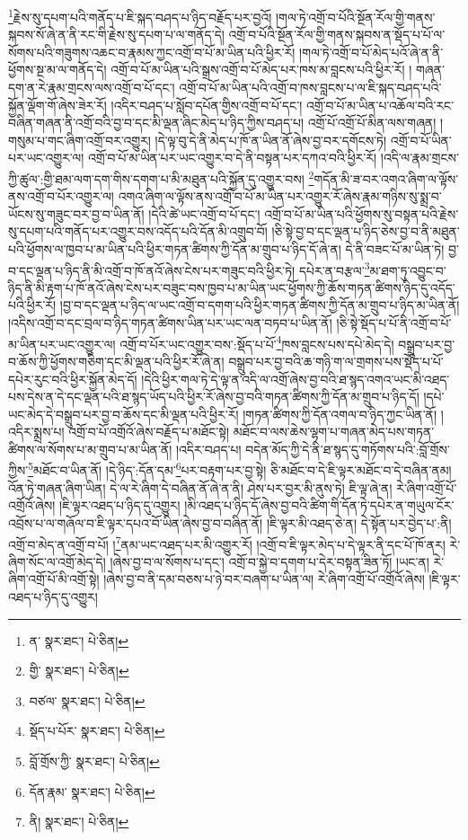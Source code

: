 \footnote{ན་  སྣར་ཐང་།  པེ་ཅིན། }རྗེས་སུ་དཔག་པའི་གནོད་པ་ཇི་སྐད་བཤད་པ་ཉིད་བརྗོད་པར་བྱའོ། །གལ་ཏེ་འགྲོ་བ་པོའི་སྔོན་རོལ་གྱི་གནས་སྐབས་སོ་ཞེ་ན་ནི་རང་གི་རྗེས་སུ་དཔག་པ་ལ་གནོད་དེ། འགྲོ་བ་པོའི་སྔོན་རོལ་གྱི་གནས་སྐབས་ན་སྡོད་པ་པོ་ལ་སོགས་པའི་གཟུགས་འཆང་བ་རྣམས་ཀྱང་འགྲོ་བ་པོ་མ་ཡིན་པའི་ཕྱིར་རོ། །གལ་ཏེ་འགྲོ་བ་པོ་མེད་པའོ་ཞེ་ན་ནི་ཕྱོགས་སྔ་མ་ལ་གནོད་དེ། འགྲོ་བ་པོ་མ་ཡིན་པའི་སྒྲས་འགྲོ་བ་པོ་མེད་པར་ཁས་མ་བླངས་པའི་ཕྱིར་རོ། །
གཞན་དག་ན་རེ་རྣམ་གྲངས་ལས་འགྲོ་བ་པོ་དང་། འགྲོ་བ་པོ་མ་ཡིན་པའི་འགྲོ་བ་ཁས་བླངས་པ་ལ་ཇི་སྐད་བཤད་པའི་སྐྱོན་ལྡོག་གོ་ཞེས་ཟེར་རོ། །འདིར་བཤད་པ་སློབ་དཔོན་གྱིས་འགྲོ་བ་པོ་དང་། འགྲོ་བ་པོ་མ་ཡིན་པ་འཆོལ་བའི་རང་བཞིན་གཞན་ནི་འགྲོ་བའི་བྱ་བ་དང་མི་ལྡན་ཞིང་མེད་པ་ཉིད་ཀྱིས་བཤད་པ། འགྲོ་པོ་འགྲོ་པོ་མིན་ལས་གཞན། །གསུམ་པ་གང་ཞིག་འགྲོ་བར་འགྱུར། །དེ་ལྟ་བུ་དེ་ནི་མེད་པ་ཁོ་ན་ཡིན་ནོ་ཞེས་བྱ་བར་དགོངས་ཏེ། འགྲོ་བ་པོ་ཡིན་པར་ཡང་འགྱུར་ལ། འགྲོ་བ་པོ་མ་ཡིན་པར་ཡང་འགྱུར་བ་དེ་ནི་བསྟན་པར་དཀའ་བའི་ཕྱིར་རོ། །འདི་ལ་རྣམ་གྲངས་ཀྱི་ཚུལ་:གྱི་ཐམ་ལག་དག་གིས་དགག་པ་མི་མཐུན་པའི་སྐྱོན་དུ་འགྱུར་བས། \footnote{གྱི་  སྣར་ཐང་།  པེ་ཅིན། }གདོན་མི་ཟ་བར་འགའ་ཞིག་ལ་ལྟོས་ནས་འགྲོ་བ་པོར་འགྱུར་ལ། འགའ་ཞིག་ལ་ལྟོས་ནས་འགྲོ་བ་པོ་མ་ཡིན་པར་འགྱུར་རོ་ཞེས་རྣམ་གཉིས་སུ་སྨྲ་བ་ཡོངས་སུ་གཟུང་བར་བྱ་བ་ཡིན་ནོ། །དེའི་ཚེ་ཡང་འགྲོ་བ་པོ་དང་། འགྲོ་བ་པོ་མ་ཡིན་པའི་ཕྱོགས་སུ་བསྟན་པའི་རྗེས་སུ་དཔག་པའི་གནོད་པར་འགྱུར་བས་འདོད་པའི་དོན་མི་འགྲུབ་བོ། །ཅི་སྟེ་བྱ་བ་དང་ལྡན་པ་ཉིད་ཅེས་བྱ་བ་ནི་མཐུན་པའི་ཕྱོགས་ལ་ཁྱབ་པ་མ་ཡིན་པའི་ཕྱིར་གཏན་ཚིགས་ཀྱི་དོན་མ་གྲུབ་པ་ཉིད་དོ་ཞེ་ན། དེ་ནི་བཟང་པོ་མ་ཡིན་ཏེ། བྱ་བ་དང་ལྡན་པ་ཉིད་ནི་མི་འགྲོ་བ་ཁོ་ནའོ་ཞེས་ངེས་པར་གཟུང་བའི་ཕྱིར་ཏེ། དཔེར་ན་བརྩལ་\footnote{བཙལ་  སྣར་ཐང་།  པེ་ཅིན། }མ་ཐག་ཏུ་འབྱུང་བ་ཉིད་ནི་མི་རྟག་པ་ཁོ་ནའོ་ཞེས་ངེས་པར་བཟུང་བས་ཁྱབ་པ་མ་ཡིན་ཡང་ཕྱོགས་ཀྱི་ཆོས་གཏན་ཚིགས་ཉིད་དུ་འདོད་པའི་ཕྱིར་རོ། །བྱ་བ་དང་ལྡན་པ་ཉིད་ལ་ཡང་འགྲོ་བ་དགག་པའི་ཕྱིར་གཏན་ཚིགས་ཀྱི་དོན་མ་གྲུབ་པ་ཉིད་མ་ཡིན་ནོ། །འདིས་འགྲོ་བ་དང་བྲལ་བ་ཉིད་གཏན་ཚིགས་ཡིན་པར་ཡང་ལན་བཏབ་པ་ཡིན་ནོ། །ཅི་སྟེ་སྡོད་པ་པོ་ནི་འགྲོ་བ་པོ་མ་ཡིན་པར་ཡང་འགྱུར་ལ། འགྲོ་བ་པོར་ཡང་འགྱུར་བས་:སྡོད་པ་པོ་\footnote{སྡོད་པ་པོར་  སྣར་ཐང་།  པེ་ཅིན། }ཁས་བླངས་པས་དཔེ་མེད་དེ། བསྒྲུབ་པར་བྱ་བ་ཆོས་ཀྱི་ཕྱོགས་གཅིག་དང་མི་ལྡན་པའི་ཕྱིར་རོ་ཞེ་ན། བསྒྲུབ་པར་བྱ་བའི་ཆ་གཉི་ག་ལ་གྲགས་པས་སྡོད་པ་པོ་དཔེར་རུང་བའི་ཕྱིར་སྐྱོན་མེད་དོ། །དེའི་ཕྱིར་གལ་ཏེ་དེ་ལྟ་ན་འདི་ལ་འགྲོ་ཞེས་བྱ་བའི་ཐ་སྙད་འགའ་ཡང་མི་འཐད་པས་དེས་ན་དེ་དང་ལྡན་པའི་ཐ་སྙད་ཡོད་པའི་ཕྱིར་རོ་ཞེས་བྱ་བའི་གཏན་ཚིགས་ཀྱི་དོན་མ་གྲུབ་པ་ཉིད་དོ། །དཔེ་ཡང་མེད་དེ་བསྒྲུབ་པར་བྱ་བ་ཆོས་དང་མི་ལྡན་པའི་ཕྱིར་རོ། །གཏན་ཚིགས་ཀྱི་དོན་འགལ་བ་ཉིད་ཀྱང་ཡིན་ནོ། །འདིར་སྨྲས་པ། འགྲོ་བ་པོ་འགྲོའོ་ཞེས་བརྗོད་པ་མཐོང་སྟེ། མཐོང་བ་ལས་ཆེས་ལྷག་པ་གཞན་མེད་པས་གཏན་ཚིགས་ལ་སོགས་པ་མ་གྲུབ་པ་མ་ཡིན་ནོ། །འདིར་བཤད་པ། བདེན་མོད་ཀྱི་དེ་ནི་ཐ་སྙད་དུ་གཏོགས་པའི་:བློ་གྲོས་ཀྱིས་\footnote{བློ་གྲོས་ཀྱི་  སྣར་ཐང་།  པེ་ཅིན། }མཐོང་བ་ཡིན་ནོ། །དེ་ཉིད་:དོན་དམ་\footnote{དོན་རྣམ་  སྣར་ཐང་།  པེ་ཅིན། }པར་བརྟག་པར་བྱ་སྟེ། ཅི་མཐོང་བ་དེ་ཇི་ལྟར་མཐོང་བ་དེ་བཞིན་ནམ། འོན་ཏེ་གཞན་ཞིག་ཡིན། དེ་ལ་རེ་ཞིག་དེ་བཞིན་ནོ་ཞེ་ན་ནི། ཤེས་པར་བྱར་མི་ནུས་ཏེ། ཇི་ལྟ་ཞེ་ན། རེ་ཞིག་འགྲོ་པོ་འགྲོའོ་ཞེས། །ཇི་ལྟར་འཐད་པ་ཉིད་དུ་འགྱུར། །མི་འཐད་པ་ཉིད་དོ་ཞེས་བྱ་བའི་ཚིག་གི་དོན་ཏེ་དཔེར་ན་གཡུལ་ངོར་འབྲོས་པ་ལ་གཞོལ་བ་ཇི་ལྟར་དཔའ་བོ་ཡིན་ཞེས་བྱ་བ་བཞིན་ནོ། །ཇི་ལྟར་མི་འཐད་ཅེ་ན། དེ་སྟོན་པར་བྱེད་པ་:ནི།འགྲོ་བ་མེད་ན་འགྲོ་བ་པོ། །\footnote{ནི།  སྣར་ཐང་།  པེ་ཅིན། }ནམ་ཡང་འཐད་པར་མི་འགྱུར་རོ། །འགྲོ་བ་ཇི་ལྟར་མེད་པ་དེ་ལྟར་ནི་དང་པོ་ཁོ་ནར། རེ་ཞིག་སོང་ལ་འགྲོ་མེད་དེ། །ཞེས་བྱ་བ་ལ་སོགས་པ་དང་། འགྲོ་བ་སྐྱེ་བ་དགག་པ་དེར་བསྟན་ཟིན་ཏོ། །ཡང་ན། རེ་ཞིག་འགྲོ་པོ་མི་འགྲོ་སྟེ། །ཞེས་བྱ་བ་ནི་དམ་བཅས་པ་ཉེ་བར་བཞག་པ་ཡིན་ལ། རེ་ཞིག་འགྲོ་པོ་འགྲོའོ་ཞེས། །ཇི་ལྟར་འཐད་པ་ཉིད་དུ་འགྱུར། 